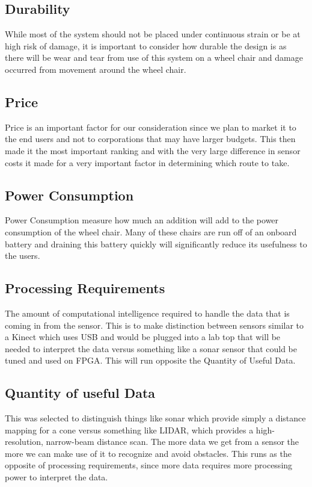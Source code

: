 \documentclass[oneside,final,a4paper]{report}
\begin{document}
\subsection{Durability}
While most of the system should not be placed under continuous strain or be at high risk of damage, it is important to consider how durable the design is as there will be wear and tear from use of this system on a wheel chair and damage occurred from movement around the wheel chair.

\subsection{Price}
Price is an important factor for our consideration since we plan to market it to the end users and not to corporations that may have larger budgets. This then made it the most important ranking and with the very large difference in sensor costs it made for a very important factor in determining which route to take.

\subsection{Power Consumption}
Power Consumption measure how much an addition will add to the power consumption of the wheel chair. Many of these chairs are run off of an onboard battery and draining this battery quickly will significantly reduce its usefulness to the users. 

\subsection{Processing Requirements}
The amount of computational intelligence required to handle the data that is coming in from the sensor. This is to make distinction between sensors similar to a Kinect which uses USB and would be plugged into a lab top that will be needed to interpret the data versus something like a sonar sensor that could be tuned and used on FPGA. This will run opposite the Quantity of Useful Data.

\subsection{Quantity of useful Data}
This was selected to distinguish things like sonar which provide simply a distance mapping for a cone versus something like LIDAR, which provides a high-resolution, narrow-beam distance scan. The more data we get from a sensor the more we can make use of it to recognize and avoid obstacles. This runs as the opposite of processing requirements, since more data requires more processing power to interpret the data.
\end{document}
